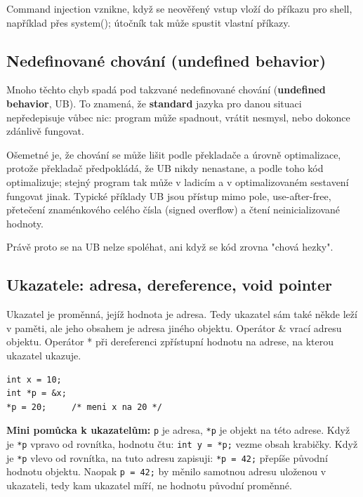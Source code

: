 \documentclass[11pt,a4paper]{article}
\newcommand{\itpr}[1]{\medskip\noindent\colorbox{green!8}{\parbox{\dimexpr\linewidth-2\fboxsep}{#1}}\medskip}
\begin{document}
Command injection vznikne, když se neověřený vstup vloží do příkazu pro shell, například přes system(); útočník tak může spustit vlastní příkazy.

\subsection*{Nedefinované chování (undefined behavior)}

Mnoho těchto chyb spadá pod takzvané nedefinované chování (\textbf{undefined behavior}, UB). To znamená, že \textbf{standard} jazyka pro danou situaci nepředepisuje vůbec nic: program může spadnout, vrátit nesmysl, nebo dokonce zdánlivě fungovat.

Ošemetné je, že chování se může lišit podle překladače a úrovně optimalizace, protože překladač předpokládá, že UB nikdy nenastane, a podle toho kód optimalizuje; stejný program tak může v ladicím a v optimalizovaném sestavení fungovat jinak. Typické příklady UB jsou přístup mimo pole, use-after-free, přetečení znaménkového celého čísla (signed overflow) a čtení neinicializované hodnoty.

Právě proto se na UB nelze spoléhat, ani když se kód zrovna "chová hezky".

\subsection*{Ukazatele: adresa, dereference, void pointer}

Ukazatel je proměnná, jejíž hodnota je adresa. Tedy ukazatel sám také někde leží v paměti, ale jeho obsahem je adresa jiného objektu. Operátor \& vrací adresu objektu. Operátor * při dereferenci zpřístupní hodnotu na adrese, na kterou ukazatel ukazuje.

\begin{codebox}
\small
\begin{verbatim}
int x = 10;
int *p = &x;
*p = 20;     /* meni x na 20 */
\end{verbatim}
\end{codebox}

\itpr{\textbf{Mini pomůcka k ukazatelům:} \texttt{p} je adresa, \texttt{*p} je objekt na této adrese. Když je \texttt{*p} vpravo od rovnítka, hodnotu čtu: \texttt{int y = *p;} vezme obsah krabičky. Když je \texttt{*p} vlevo od rovnítka, na tuto adresu zapisuji: \texttt{*p = 42;} přepíše původní hodnotu objektu. Naopak \texttt{p = 42;} by měnilo samotnou adresu uloženou v ukazateli, tedy kam ukazatel míří, ne hodnotu původní proměnné.}
\end{document}
